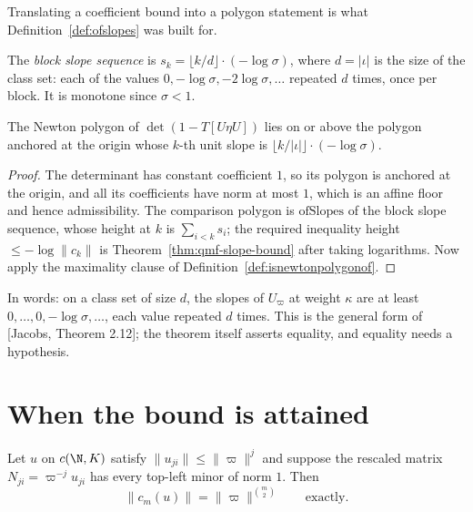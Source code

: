 Translating a coefficient bound into a polygon statement is what
Definition~\ref{def:ofslopes} was built for.

\begin{definition}
  \label{def:blockslopes}
  \leanok
  The \emph{block slope sequence} is $s_k = \lfloor k/d \rfloor \cdot (-\log \sigma)$, where $d =
  \lvert \iota \rvert$ is the size of the class set: each of the values $0, -\log\sigma,
  -2\log\sigma, \dots$ repeated $d$ times, once per block.  It is monotone since $\sigma < 1$.
\end{definition}

\begin{theorem}
  \label{thm:qmf-slope-theorem}
  \leanok
  The Newton polygon of $\det(1 - T[U\eta U])$ lies on or above the polygon anchored at the
  origin whose $k$-th unit slope is $\lfloor k/\lvert\iota\rvert\rfloor \cdot (-\log \sigma)$.
\end{theorem}

\begin{proof}
  \leanok
  The determinant has constant coefficient $1$, so its polygon is anchored at the origin, and all
  its coefficients have norm at most $1$, which is an affine floor and hence admissibility.  The
  comparison polygon is $\mathrm{ofSlopes}$ of the block slope sequence, whose height at $k$ is
  $\sum_{i<k} s_i$; the required inequality height $\leq -\log\lVert c_k\rVert$ is
  Theorem~\ref{thm:qmf-slope-bound} after taking logarithms.  Now apply the maximality clause of
  Definition~\ref{def:isnewtonpolygonof}.
\end{proof}

In words: on a class set of size $d$, the slopes of $U_\varpi$ at weight $\kappa$ are at least
$0, \dots, 0, -\log\sigma, \dots$, each value repeated $d$ times.  This is the general form of
[Jacobs, Theorem 2.12]; the theorem itself asserts equality, and equality needs a hypothesis.

\section{When the bound is attained}

\begin{theorem}
  \label{thm:unit-minors}
  \leanok
  Let $u$ on $c(\N,K)$ satisfy $\lVert u_{ji}\rVert \leq \lVert \varpi \rVert^j$ and suppose the
  rescaled matrix $N_{ji} = \varpi^{-j} u_{ji}$ has every top-left minor of norm $1$.  Then
  \[
    \lVert c_m(u) \rVert = \lVert \varpi \rVert^{\binom{m}{2}} \qquad \text{exactly}.
  \]
\end{theorem}

